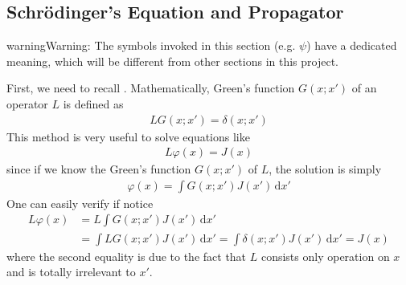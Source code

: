\documentclass[letterpaper,10pt,english]{sphinxmanual}
\begin{document}
\subsection{Schrödinger’s Equation and Propagator}
\label{\detokenize{pi_ppgt:schrodingers-equation-and-propagator}}
\begin{sphinxadmonition}{warning}{Warning:}
The symbols invoked in this section (e.g. \(\psi\)) have a dedicated meaning, which will be different from other sections in this project.
\end{sphinxadmonition}

First, we need to recall . Mathematically, Green's function \(G(x;x')\) of an operator \(L\) is defined as
\begin{equation*}
\begin{split}LG(x;x') = \delta(x;x')\end{split}
\end{equation*}
This method is very useful to solve equations like
\begin{equation*}
\begin{split}L\varphi(x) = J(x)\end{split}
\end{equation*}
since if we know the Green's function \(G(x;x')\) of \(L\), the solution is simply
\begin{equation*}
\begin{split}\varphi(x) = \int G(x;x') J(x')\,\mathrm{d}x'\end{split}
\end{equation*}
One can easily verify if notice
\begin{equation*}
\begin{split}L\varphi(x) &= L\int G(x;x') J(x')\,\mathrm{d}x' \\
&= \int LG(x;x') J(x')\,\mathrm{d}x' = \int \delta(x;x') J(x')\,\mathrm{d}x' = J(x)\end{split}
\end{equation*}
where the second equality is due to the fact that \(L\) consists only operation on \(x\) and is totally irrelevant to \(x'\).
\end{document}
